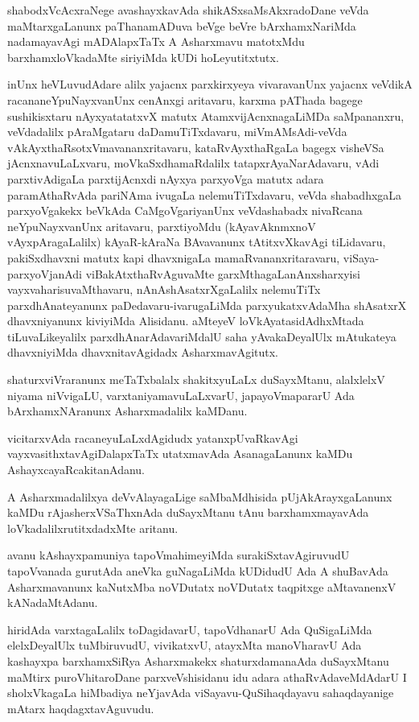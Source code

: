 shabodxVcAcxraNege avashayxkavAda shikASxsaMsAkxradoDane veVda maMtarxgaLanunx paThanamADuva beVge beVre bArxhamxNariMda nadamayavAgi mADAlapxTaTx A Asharxmavu matotxMdu barxhamxloVkadaMte siriyiMda kUDi hoLeyutitxtutx.

inUnx heVLuvudAdare alilx yajacnx parxkirxyeya vivaravanUnx yajacnx veVdikA racananeYpuNayxvanUnx cenAnxgi aritavaru, karxma pAThada bagege sushikisxtaru nAyxyatatatxvX matutx AtamxvijAcnxnagaLiMDa saMpananxru, veVdadalilx pAraMgataru daDamuTiTxdavaru, miVmAMsAdi-veVda vAkAyxthaRsotxVmavananxritavaru, kataRvAyxthaRgaLa bagegx visheVSa jAcnxnavuLaLxvaru, moVkaSxdhamaRdalilx tatapxrAyaNarAdavaru, vAdi parxtivAdigaLa parxtijAcnxdi nAyxya parxyoVga matutx adara paramAthaRvAda pariNAma ivugaLa nelemuTiTxdavaru, veVda shabadhxgaLa parxyoVgakekx beVkAda CaMgoVgariyanUnx veVdashabadx nivaRcana neYpuNayxvanUnx aritavaru, parxtiyoMdu (kAyavAknmxnoV vAyxpAragaLalilx) kAyaR-kAraNa BAvavanunx tAtitxvXkavAgi tiLidavaru, pakiSxdhavxni matutx kapi dhavxnigaLa mamaRvananxritaravaru, viSaya-parxyoVjanAdi viBakAtxthaRvAguvaMte garxMthagaLanAnxsharxyisi vayxvaharisuvaMthavaru, nAnAshAsatxrXgaLalilx nelemuTiTx parxdhAnateyanunx paDedavaru-ivarugaLiMda parxyukatxvAdaMha shAsatxrX dhavxniyanunx kiviyiMda Alisidanu. aMteyeV loVkAyatasidAdhxMtada tiLuvaLikeyalilx parxdhAnarAdavariMdalU saha yAvakaDeyalUlx mAtukateya dhavxniyiMda dhavxnitavAgidadx AsharxmavAgitutx.

shaturxviVraranunx meTaTxbalalx shakitxyuLaLx duSayxMtanu, alalxlelxV niyama niVvigaLU, varxtaniyamavuLaLxvarU, japayoVmapararU Ada bArxhamxNAranunx Asharxmadalilx kaMDanu.

vicitarxvAda racaneyuLaLxdAgidudx yatanxpUvaRkavAgi vayxvasithxtavAgiDalapxTaTx utatxmavAda AsanagaLanunx kaMDu AshayxcayaRcakitanAdanu.

A Asharxmadalilxya deVvAlayagaLige saMbaMdhisida pUjAkArayxgaLanunx kaMDu rAjasherxVSaThxnAda duSayxMtanu tAnu barxhamxmayavAda loVkadalilxrutitxdadxMte aritanu.

avanu kAshayxpamuniya tapoVmahimeyiMda surakiSxtavAgiruvudU tapoVvanada gurutAda aneVka guNagaLiMda kUDidudU Ada A shuBavAda Asharxmavanunx kaNutxMba noVDutatx noVDutatx taqpitxge aMtavanenxV kANadaMtAdanu.

hiridAda varxtagaLalilx toDagidavarU, tapoVdhanarU Ada QuSigaLiMda elelxDeyalUlx tuMbiruvudU, vivikatxvU, atayxMta manoVharavU Ada kashayxpa barxhamxSiRya Asharxmakekx shaturxdamanaAda duSayxMtanu maMtirx puroVhitaroDane parxveVshisidanu idu adara athaRvAdaveMdAdarU I sholxVkagaLa hiMbadiya neYjavAda viSayavu-QuSihaqdayavu sahaqdayanige mAtarx haqdagxtavAguvudu.


